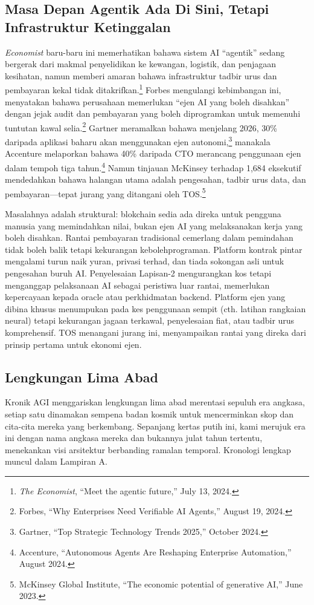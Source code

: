 \documentclass[11pt]{article}
\begin{document}
\subsection{Masa Depan Agentik Ada Di Sini, Tetapi Infrastruktur Ketinggalan}
\emph{Economist} baru-baru ini memerhatikan bahawa sistem AI ``agentik'' sedang bergerak dari makmal penyelidikan ke kewangan, logistik, dan penjagaan kesihatan, namun memberi amaran bahawa infrastruktur tadbir urus dan pembayaran kekal tidak ditakrifkan.\footnote{\emph{The Economist}, ``Meet the agentic future,'' July 13, 2024.} Forbes mengulangi kebimbangan ini, menyatakan bahawa perusahaan memerlukan ``ejen AI yang boleh disahkan'' dengan jejak audit dan pembayaran yang boleh diprogramkan untuk memenuhi tuntutan kawal selia.\footnote{Forbes, ``Why Enterprises Need Verifiable AI Agents,'' August 19, 2024.} Gartner meramalkan bahawa menjelang 2026, 30\% daripada aplikasi baharu akan menggunakan ejen autonomi,\footnote{Gartner, ``Top Strategic Technology Trends 2025,'' October 2024.} manakala Accenture melaporkan bahawa 40\% daripada CTO merancang penggunaan ejen dalam tempoh tiga tahun.\footnote{Accenture, ``Autonomous Agents Are Reshaping Enterprise Automation,'' August 2024.} Namun tinjauan McKinsey terhadap 1,684 eksekutif mendedahkan bahawa halangan utama adalah pengesahan, tadbir urus data, dan pembayaran---tepat jurang yang ditangani oleh TOS.\footnote{McKinsey Global Institute, ``The economic potential of generative AI,'' June 2023.}

Masalahnya adalah struktural: blokchain sedia ada direka untuk pengguna manusia yang memindahkan nilai, bukan ejen AI yang melaksanakan kerja yang boleh disahkan. Rantai pembayaran tradisional cemerlang dalam pemindahan tidak boleh balik tetapi kekurangan kebolehprograman. Platform kontrak pintar mengalami turun naik yuran, privasi terhad, dan tiada sokongan asli untuk pengesahan buruh AI. Penyelesaian Lapisan-2 mengurangkan kos tetapi menganggap pelaksanaan AI sebagai peristiwa luar rantai, memerlukan kepercayaan kepada oracle atau perkhidmatan backend. Platform ejen yang dibina khusus menumpukan pada kes penggunaan sempit (cth. latihan rangkaian neural) tetapi kekurangan jagaan terkawal, penyelesaian fiat, atau tadbir urus komprehensif. TOS menangani jurang ini, menyampaikan rantai yang direka dari prinsip pertama untuk ekonomi ejen.

\subsection{Lengkungan Lima Abad}
Kronik AGI menggariskan lengkungan lima abad merentasi sepuluh era angkasa, setiap satu dinamakan sempena badan kosmik untuk mencerminkan skop dan cita-cita mereka yang berkembang. Sepanjang kertas putih ini, kami merujuk era ini dengan nama angkasa mereka dan bukannya julat tahun tertentu, menekankan visi arsitektur berbanding ramalan temporal. Kronologi lengkap muncul dalam Lampiran A.
\end{document}
